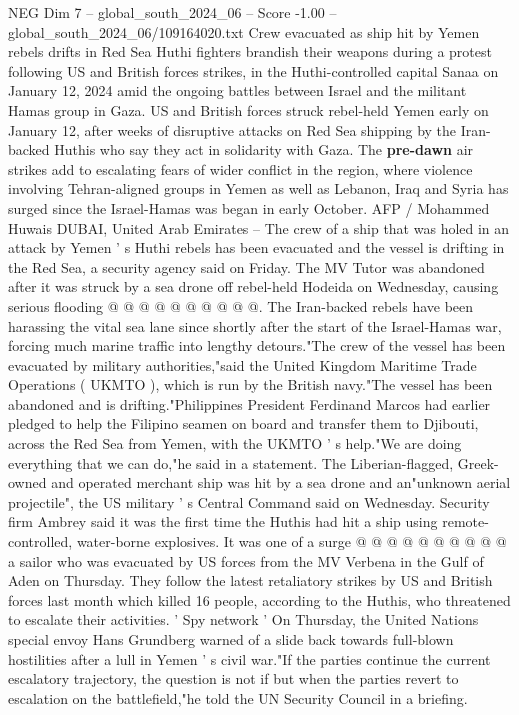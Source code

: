 \begin{textsample}{NEG Dim 7 – global\_south\_2024\_06 – Score -1.00 – global\_south\_2024\_06/109164020.txt}  \label{ex:f7_neg_213}
Crew evacuated as ship hit by Yemen rebels drifts in Red Sea Huthi fighters brandish their weapons during a protest following US and British forces strikes, in the Huthi-controlled capital Sanaa on January 12, 2024 amid the ongoing battles between Israel and the militant Hamas group in Gaza.
US and British forces struck rebel-held Yemen early on January 12, after weeks of disruptive attacks on Red Sea shipping by the Iran-backed Huthis who say they act in solidarity with Gaza.
The \textbf{pre-dawn} air strikes add to escalating fears of wider conflict in the region, where violence involving Tehran-aligned groups in Yemen as well as Lebanon, Iraq and Syria has surged since the Israel-Hamas was began in early October.
AFP / Mohammed Huwais DUBAI, United Arab Emirates -- The crew of a ship that was holed in an attack by Yemen ' s Huthi rebels has been evacuated and the vessel is drifting in the Red Sea, a security agency said on Friday.
The MV Tutor was abandoned after it was struck by a sea drone off rebel-held Hodeida on Wednesday, causing serious flooding @ @ @ @ @ @ @ @ @ @.
The Iran-backed rebels have been harassing the vital sea lane since shortly after the start of the Israel-Hamas war, forcing much marine traffic into lengthy detours."The crew of the vessel has been evacuated by military authorities,"said the United Kingdom Maritime Trade Operations ( UKMTO ), which is run by the British navy."The vessel has been abandoned and is drifting."Philippines President Ferdinand Marcos had earlier pledged to help the Filipino seamen on board and transfer them to Djibouti, across the Red Sea from Yemen, with the UKMTO ' s help."We are doing everything that we can do,"he said in a statement.
The Liberian-flagged, Greek-owned and operated merchant ship was hit by a sea drone and an"unknown aerial projectile", the US military ' s Central Command said on Wednesday.
Security firm Ambrey said it was the first time the Huthis had hit a ship using remote-controlled, water-borne explosives.
It was one of a surge @ @ @ @ @ @ @ @ @ @ a sailor who was evacuated by US forces from the MV Verbena in the Gulf of Aden on Thursday.
They follow the latest retaliatory strikes by US and British forces last month which killed 16 people, according to the Huthis, who threatened to escalate their activities. ' Spy network ' On Thursday, the United Nations special envoy Hans Grundberg warned of a slide back towards full-blown hostilities after a lull in Yemen ' s civil war."If the parties continue the current escalatory trajectory, the question is not if but when the parties revert to escalation on the battlefield,"he told the UN Security Council in a briefing.

\end{textsample}
